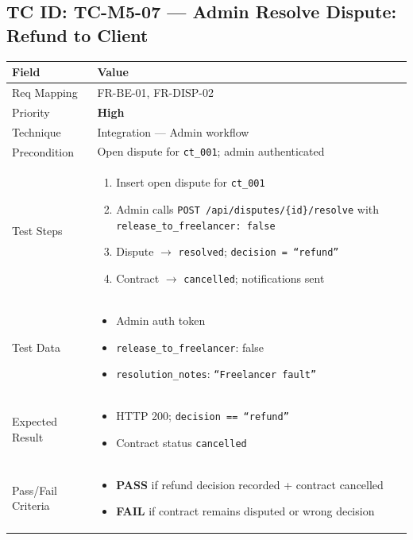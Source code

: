 \documentclass[12pt,a4paper]{article}
\newcommand{\sevhigh}{\textcolor{severityhigh}{\textbf{High}}}
\newcommand{\passresult}{\textcolor{passgreen}{\textbf{PASS}}}
\newcommand{\failresult}{\textcolor{failred}{\textbf{FAIL}}}
\begin{document}
\vspace{0.8cm}

\subsection{TC ID: TC-M5-07 --- Admin Resolve Dispute: Refund to Client}

\begin{tabular}{|p{}|p{}|}
\hline
\rowcolor{lightblue} \textbf{Field} & \textbf{Value} \\
\hline
Req Mapping & FR-BE-01, FR-DISP-02 \\
\hline
Priority & \sevhigh \\
\hline
Technique & Integration --- Admin workflow \\
\hline
Precondition & Open dispute for \texttt{ct\_001}; admin authenticated \\
\hline
Test Steps &
\begin{enumerate}[nosep, leftmargin=*]
  \item Insert open dispute for \texttt{ct\_001}
  \item Admin calls \texttt{POST /api/disputes/\{id\}/resolve} with \texttt{release\_to\_freelancer: false}
  \item Dispute $\rightarrow$ \texttt{resolved}; \texttt{decision = ``refund''}
  \item Contract $\rightarrow$ \texttt{cancelled}; notifications sent
\end{enumerate} \\
\hline
Test Data &
\begin{itemize}[nosep, leftmargin=*]
  \item Admin auth token
  \item \texttt{release\_to\_freelancer}: false
  \item \texttt{resolution\_notes}: \texttt{``Freelancer fault''}
\end{itemize} \\
\hline
Expected Result &
\begin{itemize}[nosep, leftmargin=*]
  \item HTTP 200; \texttt{decision == ``refund''}
  \item Contract status \texttt{cancelled}
\end{itemize} \\
\hline
Pass/Fail Criteria &
\begin{itemize}[nosep, leftmargin=*]
  \item \passresult{} if refund decision recorded + contract cancelled
  \item \failresult{} if contract remains disputed or wrong decision
\end{itemize} \\
\hline
\end{tabular}
\end{document}
